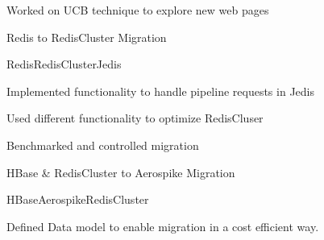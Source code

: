 \documentclass[8pt,a4paper]{article}
\begin{document}
\begin{multicols}{2}
\begin{desc}{Worked on UCB technique to explore new web pages}
\end{desc}
\begin{expsec}{Redis to RedisCluster Migration}
\end{expsec}
\begin{expsubsec}{Redis{\textbar}RedisCluster{\textbar}Jedis}
\end{expsubsec}
\begin{desc}{Implemented functionality to handle pipeline requests in Jedis}
\end{desc}
\begin{desc}{Used different functionality to optimize RedisCluser}
\end{desc}
\begin{desc}{Benchmarked and controlled migration}
\end{desc}
\begin{expsec}{HBase \& RedisCluster to Aerospike Migration}
\end{expsec}
\begin{expsubsec}{HBase{\textbar}Aerospike{\textbar}RedisCluster}
\end{expsubsec}
\begin{desc}{Defined Data model to enable migration in a cost efficient way.}
\end{desc}








\end{multicols}
\end{document}
